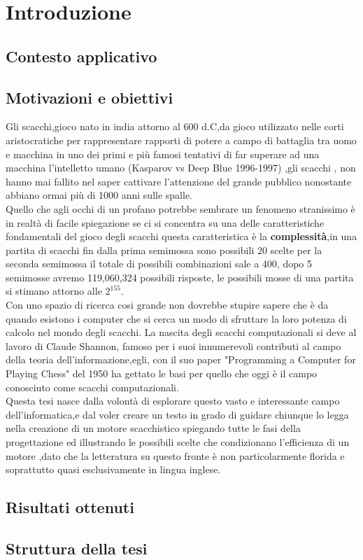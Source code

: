 \chapter{Introduzione}

\section{Contesto applicativo} %

\section{Motivazioni e obiettivi}
Gli scacchi,gioco nato in india attorno al 600 d.C,da gioco utilizzato nelle corti aristocratiche
 per rappresentare rapporti di potere a campo di battaglia tra uomo e macchina in uno dei primi e 
 più famosi tentativi di far superare ad una macchina l'intelletto umano (Kasparov vs Deep Blue 1996-1997)
,gli scacchi , non hanno mai  fallito nel saper cattivare  l'attenzione
 del grande pubblico nonostante abbiano ormai più di 1000 anni sulle spalle.
 \\Quello che agli occhi di un profano potrebbe sembrare un fenomeno  stranissimo
 è in realtà di facile spiegazione se ci si concentra su una delle caratteristiche fondamentali del 
 gioco degli scacchi  questa caratteristica è la \textbf{complessità},in una partita di scacchi fin dalla prima semimossa 
  sono possibili 20 scelte per la seconda semimossa il totale di possibili combinazioni  sale a 400,
 dopo 5 semimosse avremo 119,060,324 possibili risposte, le possibili mosse di una partita si stimano attorno alle \(2^{155} \).
 \\Con uno spazio di ricerca cosi grande non dovrebbe stupire sapere che è da quando esistono i computer che si cerca un modo
 di sfruttare la loro potenza di calcolo nel mondo degli scacchi.
 La nascita degli scacchi computazionali si deve al lavoro di Claude Shannon, famoso per i suoi innumerevoli contributi al 
 campo della teoria dell'informazione,egli, con il suo paper "Programming a Computer for Playing Chess" del 1950 ha gettato le
 basi per quello che oggi è il campo conosciuto come scacchi computazionali.
 \\Questa tesi nasce dalla volontà di esplorare questo vasto e interessante campo dell'informatica,e dal voler creare un testo
 in grado di guidare chiunque lo legga nella creazione di un motore scacchistico spiegando tutte le fasi della progettazione
 ed illustrando le possibili scelte che condizionano l'efficienza di un motore
 ,dato che la letteratura su questo fronte è  non particolarmente florida e soprattutto quasi esclusivamente in lingua inglese.




\section{Risultati ottenuti}

\section{Struttura della tesi}

